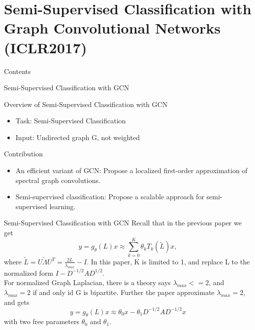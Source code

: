 \documentclass{beamer}
\begin{document}
	\section[GCN ICLR 2017]{Semi-Supervised Classification with Graph Convolutional Networks (ICLR2017)}
		\begin{frame}{Contents}
			\small
		\end{frame}
		\begin{frame}{Semi-Supervised Classification with GCN}
			\begin{block}{Overview of Semi-Supervised Classification with GCN}
				\begin{itemize}
					\item Task: Semi-Supervised Classification
					\item Input: Undirected graph G, not weighted
				\end{itemize}
			\end{block}
			\begin{block}{Contribution}
				\begin{itemize}
					\item An efficient variant of GCN: Propose a localized first-order approximation of spectral graph convolutions.
					\item Semi-supervised classification: Propose a scalable approach for semi-supervised learning.
				\end{itemize}
			\end{block}
		\end{frame}
		\begin{frame}{Semi-Supervised Classification with GCN}
			Recall that in the previous paper we get
			\[
			y=g_\theta(L)x \approx \sum_{k=0}^{K}\theta_kT_k(\tilde{L})x,
			\]
			where $\tilde{L} = U\tilde{\Lambda}U^T = \frac{2L}{\lambda_{max}}-I.$
			\newline\newline
			In this paper, K is limited to 1, and replace L to the normalized form $I-D^{-1/2}AD^{1/2}$.\\
			For normalized Graph Laplacian, there is a theory says $\lambda_{max} <= 2$, and $\lambda_{max} = 2$ if and only id G is bipartite. Further the paper approximate $\lambda_{max} = 2$, and gets
			\[
			y=g_\theta(L)x \approx \theta_0x - \theta_1D^{-1/2}AD^{-1/2}x
			\]
			with two free parameters $\theta_0$ and $\theta_1$.
		\end{frame}
\end{document}
